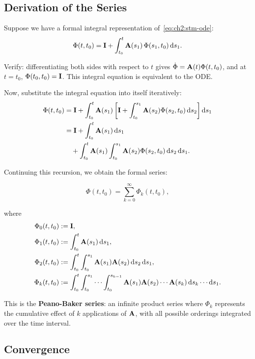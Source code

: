\subsection{Derivation of the Series}

Suppose we have a formal integral representation of~\eqref{eq:ch2:stm-ode}:
\begin{equation}
\Phi(t,t_0) = \mathbf{I} + \int_{t_0}^{t}\mathbf{A}(s_1)\,\Phi(s_1,t_0)\,\mathrm{d} s_1.
\label{eq:ch2:stm-integral}
\end{equation}

Verify: differentiating both sides with respect to $t$ gives $\dot{\Phi} = \mathbf{A}(t)\Phi(t,t_0)$,
and at $t=t_0$, $\Phi(t_0,t_0) = \mathbf{I}$. This integral equation is equivalent to the ODE.

Now, substitute the integral equation into itself iteratively:
\begin{align}
\Phi(t,t_0) &= \mathbf{I} + \int_{t_0}^{t}\mathbf{A}(s_1)\left[\mathbf{I} + \int_{t_0}^{s_1}\mathbf{A}(s_2)\Phi(s_2,t_0)\,\mathrm{d} s_2\right]\mathrm{d} s_1\\
&= \mathbf{I} + \int_{t_0}^{t}\mathbf{A}(s_1)\,\mathrm{d} s_1\\
&\quad+ \int_{t_0}^{t}\mathbf{A}(s_1)\int_{t_0}^{s_1}\mathbf{A}(s_2)\Phi(s_2,t_0)\,\mathrm{d} s_2\,\mathrm{d} s_1.
\end{align}

Continuing this recursion, we obtain the formal series:

\begin{equation}
\boxed{
\Phi(t,t_0) = \sum_{k=0}^{\infty}\Phi_k(t,t_0),
}
\label{eq:ch2:peano-baker}
\end{equation}

where
\begin{align}
\Phi_0(t,t_0) &:= \mathbf{I},\\
\Phi_1(t,t_0) &:= \int_{t_0}^{t}\mathbf{A}(s_1)\,\mathrm{d} s_1,\\
\Phi_2(t,t_0) &:= \int_{t_0}^{t}\int_{t_0}^{s_1}\mathbf{A}(s_1)\mathbf{A}(s_2)\,\mathrm{d} s_2\,\mathrm{d} s_1,\\
\Phi_k(t,t_0) &:= \int_{t_0}^{t}\int_{t_0}^{s_1}\cdots\int_{t_0}^{s_{k-1}}\mathbf{A}(s_1)\mathbf{A}(s_2)\cdots\mathbf{A}(s_k)\,\mathrm{d} s_k\cdots\mathrm{d} s_1.
\label{eq:ch2:peano-terms}
\end{align}

This is the \textbf{Peano-Baker series}: an infinite product series where $\Phi_k$ represents
the cumulative effect of $k$ applications of $\mathbf{A}$, with all possible orderings integrated
over the time interval.

\subsection{Convergence}


